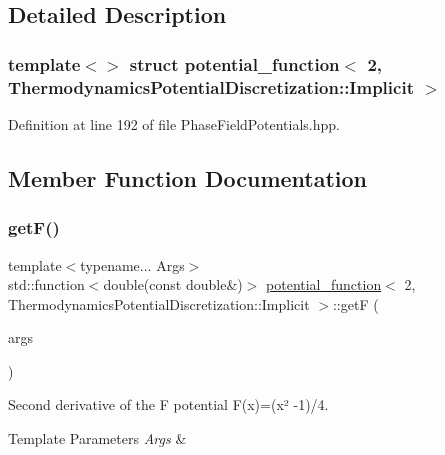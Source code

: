 \subsection{Detailed Description}
\subsubsection*{template$<$$>$\newline
struct potential\+\_\+function$<$ 2, Thermodynamics\+Potential\+Discretization\+::\+Implicit $>$}



Definition at line 192 of file Phase\+Field\+Potentials.\+hpp.



\subsection{Member Function Documentation}
\mbox{\label{structpotential__function_3_012_00_01ThermodynamicsPotentialDiscretization_1_1Implicit_01_4_a574cf32bb9412402a3e3e722807e8480}} 
\subsubsection{\texorpdfstring{get\+F()}{getF()}}
{\footnotesize\ttfamily template$<$typename... Args$>$ \\
std\+::function$<$double(const double\&)$>$ \hyperlink{structpotential__function}{potential\+\_\+function}$<$ 2, Thermodynamics\+Potential\+Discretization\+::\+Implicit $>$\+::getF (\begin{DoxyParamCaption}\item[{Args...}]{args }\end{DoxyParamCaption})\hspace{0.3cm}{\ttfamily [inline]}}



Second derivative of the F potential F(x)=(x² -\/1)/4. 


\begin{DoxyTemplParams}{Template Parameters}
{\em Args} & \\
\hline
\end{DoxyTemplParams}

